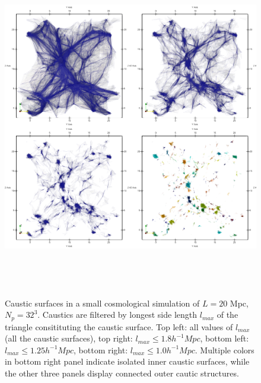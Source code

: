 \begin{figure} 
\centering\includegraphics[height=15cm]{Chapter2/Plots/caustic_connectivity.png} 
\caption{Caustic surfaces in a small cosmological simulation of $L=20$ Mpc, $N_p = 32^3$. Caustics are filtered by longest side length $l_{max}$ of the triangle consitituting the caustic surface. Top left: all values of $l_{max}$ (all the caustic surfaces), top right: $ l_{max} \leq 1.8  h^{-1} Mpc$, bottom left: $ l_{max} \leq 1.25  h^{-1} Mpc$, bottom right: $ l_{max} \leq 1.0  h^{-1} Mpc$. Multiple colors in bottom right panel indicate isolated inner caustic surfaces, while the other three panels display connected outer cautic structures.}
\label{fig:caustic_lmax}
\end{figure}

